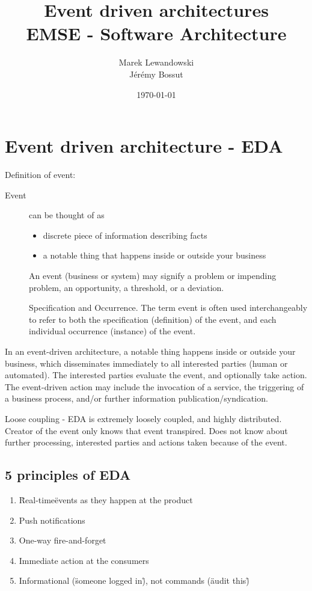 \documentclass[12pt, a4paper]{article}
\author{Marek Lewandowski \\ Jérémy Bossut}
\date{\today}
\title{Event driven architectures \\ \vspace{2 mm} {\large EMSE - Software Architecture}}
\begin{document}
\maketitle



\newpage

\section{Event driven architecture - EDA}
Definition of event:

\begin{description}
\item[Event] can be thought of as
\begin{itemize}
 \item discrete piece of information describing facts
 \item a notable thing that happens inside or outside your business
 \end{itemize}

 An event (business or system) may signify a problem or impending problem, an opportunity, a threshold, or a deviation.

 Specification and Occurrence. The term event is often used interchangeably to refer to both the specification (definition) of the event, and each individual occurrence (instance) of the event.

\end{description}

In an event-driven architecture, a notable thing happens inside or outside your business, which disseminates immediately to all interested parties (human or automated). The interested parties evaluate the event, and optionally take action. The event-driven action may include the invocation of a service, the triggering of a business process, and/or further information publication/syndication.

Loose coupling - EDA is extremely loosely coupled, and highly distributed. Creator of the event only knows that event transpired. Does not know about further processing, interested parties and actions taken because of the event.

\subsection{5 principles of EDA}
\begin{enumerate}
\item \"Real-time\" events as they happen at the product
\item Push notifications
\item One-way fire-and-forget
\item Immediate action at the consumers 
\item Informational (\"someone logged in\"), not commands (\"audit this\") 
\end{enumerate}
\end{document}
